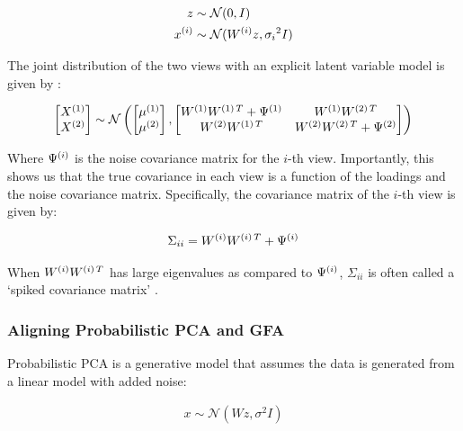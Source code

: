 \begin{align}
    z &\sim \mathcal{N}(0, I)\\
    x^{(i)} &\sim \mathcal{N}(W^{(i)} z, {\sigma_{i}}^{2}I)
\end{align}

The joint distribution of the two views with an explicit latent variable model is given by \citep{bach2005probabilistic}:

\begin{align}
    \begin{bmatrix}
        X^{(1)} \\ X^{(2)}
    \end{bmatrix} \sim \mathcal{N} \left( \begin{bmatrix}
                                              \mu^{(1)} \\ \mu^{(2)}
    \end{bmatrix}, \begin{bmatrix}
                       W^{(1)}W^{(1)\,T} + \Psi^{(1)} & W^{(1)}W^{(2)\,T} \\ W^{(2)}W^{(1)\,T} & W^{(2)}W^{(2)\,T} + \Psi^{(2)}
    \end{bmatrix} \right)
\end{align}

Where \(\Psi^{(i)}\) is the noise covariance matrix for the \(i\)-th view.
Importantly, this shows us that the true covariance in each view is a function of the loadings and the noise covariance matrix.
Specifically, the covariance matrix of the \(i\)-th view is given by:

\begin{align}
    \Sigma_{ii} = W^{(i)}W^{(i)\,T} + \Psi^{(i)}
\end{align}

When $W^{(i)}W^{(i)\,T}$ has large eigenvalues as compared to $\Psi^{(i)}$, $\Sigma_{ii}$ is often called a `spiked covariance matrix' \citep{johnstone2001distribution}.

\subsubsection{Aligning Probabilistic PCA and GFA}

Probabilistic PCA \citep{tipping1999probabilistic} is a generative model that assumes the data is generated from a linear model with added noise:

\begin{align}
    x \sim \mathcal{N}(Wz, {\sigma}^{2}I)
\end{align}

